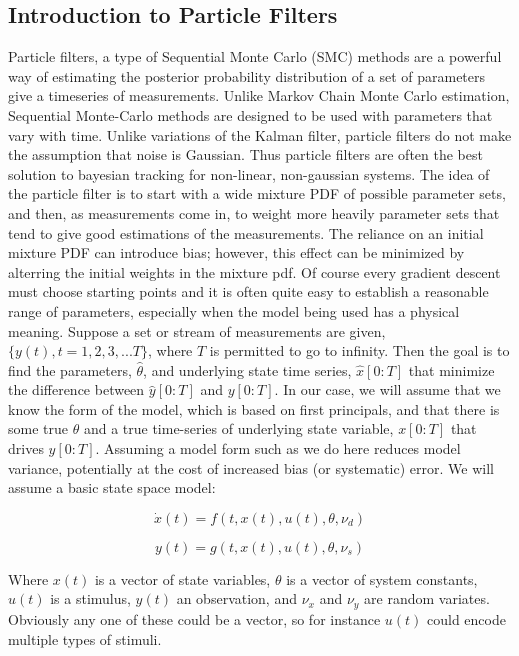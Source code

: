 \documentclass{article}
\begin{document}
\subsection*{Introduction to Particle Filters}
Particle filters, a type of Sequential Monte Carlo (SMC) methods
are a powerful way of estimating the posterior probability distribution
of a set of parameters give a timeseries of measurements. Unlike Markov 
Chain Monte Carlo estimation, Sequential Monte-Carlo methods are designed
to be used with parameters that vary with time. Unlike variations of the
Kalman filter, particle filters do not make the assumption that noise
is Gaussian. Thus particle filters are often the best solution to bayesian 
tracking for non-linear, non-gaussian systems. 
The idea of the particle
filter is to start with a wide mixture PDF of possible parameter sets, 
and then, as measurements come in, to weight more heavily parameter sets 
that tend to give good estimations of the measurements. The reliance on
an initial mixture PDF can introduce bias; however, this effect can be
minimized by alterring the initial weights in the mixture pdf. Of course
every gradient descent must choose starting points and it is often quite
easy to establish a reasonable range of parameters, especially when the
model being used has a physical meaning. Suppose a set or stream of measurements
are given, $\{y(t), t = 1, 2, 3, ... T\}$, where $T$ is permitted to go
 to infinity. Then the goal is to find the 
parameters, $\hat{\theta}$, and underlying state time series, $\hat{x}[0:T]$
that minimize the difference between $\hat{y}[0:T]$
and $y[0:T]$. In our case, we will assume that we know the form
of the model, which is based on first principals, and that
there is some true $\theta$ and a true time-series of underlying
state variable, $x[0:T]$ that drives $y[0:T]$. Assuming a model form 
such as we do here reduces model variance, potentially at the cost of increased
bias (or systematic) error. We will assume a basic state space model:

\begin{equation}
\dot{x}(t) = f(t, x(t), u(t), \theta, \nu_d)
\end{equation}

\begin{equation}
y(t) = g(t, x(t), u(t), \theta, \nu_s)
\end{equation}

Where $x(t)$ is a vector of state variables, $\theta$ is a vector of system
constants, $u(t)$ is a stimulus, $y(t)$ an observation, and
$\nu_x$ and $\nu_y$ are random variates. Obviously any one of these could
be a vector, so for instance $u(t)$ could encode multiple types of stimuli.
\end{document}
